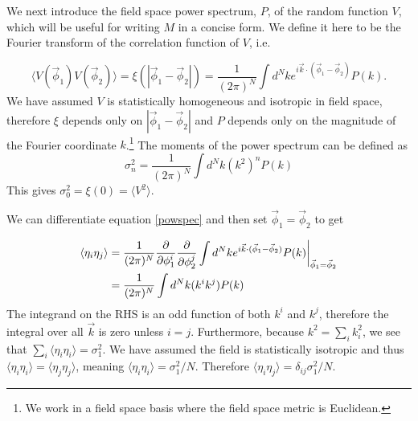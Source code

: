 \documentclass[12pt]{article}
\begin{document}
We next introduce the field space power spectrum, $P$, of the random function $V$, which will be useful for writing $M$ in a concise form. We define it here to be the Fourier transform of the correlation function of $V$, i.e.

\begin{equation}\label{powspec}
\langle V(\vec{\phi}_1) V(\vec{\phi}_2) \rangle = \xi(|\vec{\phi}_1-\vec{\phi}_2|)= \frac{1}{(2\pi)^N} \int d^Nk e^{i \vec{k} \cdot (\vec{\phi}_1-\vec{\phi}_2)} P(k).
\end{equation}
%
We have assumed $V$ is statistically homogeneous and isotropic in field space, therefore $\xi$ depends only on $|\vec{\phi}_1-\vec{\phi}_2|$ and  $P$ depends only on the magnitude of the Fourier coordinate $k$.\footnote{We work in a field space basis where the field space metric is Euclidean.} The moments of the power spectrum can be defined as
%
\begin{equation} \label{moments}
\sigma_n^2 = \frac{1}{(2\pi)^N}\int d^Nk (k^{2})^n P(k)
\end{equation}
%
This gives $\sigma_0^2=\xi(0)=\langle V^2 \rangle$.

We can differentiate equation \eqref{powspec} and then set $\vec{\phi}_1 = \vec{\phi}_2$ to get

\begin{align*}
\langle \eta_{i}\eta_{j}\rangle &= \frac{1}{(2\pi)^N} \frac{\partial}{\partial \phi_1^i}\frac{\partial}{\partial \phi_2^j} \int d^Nk e^{i \vec{k} \cdot (\vec{\phi}_1-\vec{\phi}_2)} P(k)\bigg{|}_{\vec{\phi}_1=\vec{\phi}_2}\\
&= \frac{1}{(2\pi)^N}\int d^Nk (k^i k^j) P(k)
\end{align*}
%
The integrand on the RHS is an odd function of both $k^i$ and $k^j$, therefore the integral over all $\vec{k}$ is zero unless $i=j$. Furthermore, because $k^2 = \sum_i k_i^2$, we see that $\sum_i \langle \eta_{i}\eta_{i}\rangle = \sigma_1^2$. We have assumed the field is statistically isotropic and thus $\langle \eta_{i}\eta_{i}\rangle=\langle \eta_{j}\eta_{j}\rangle$, meaning $\langle \eta_{i}\eta_{i}\rangle=\sigma_1^2/N$. Therefore $\langle \eta_{i}\eta_{j}\rangle=\delta_{ij}\sigma_1^2/N$.

\end{document}
